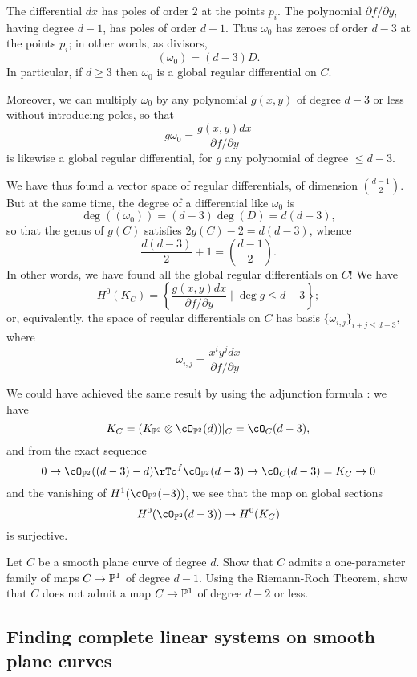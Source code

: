 The differential $dx$ has poles of order $2$ at the points $p_i$. The polynomial $\partial f/\partial y$, having degree $d-1$, has poles of order $d-1$. Thus $\omega_0$ has zeroes of order $d-3$ at the points $p_i$; in other words, as divisors,
$$
(\omega_0) = (d-3)D.
$$
In particular, if $d \geq 3$ then $\omega_0$ is a global regular differential on $C$.

Moreover, we can  multiply $\omega_0$ by any polynomial $g(x,y)$ 
  of degree $d-3$ or less without introducing poles, so that 
$$
g\omega_0 = \frac{g(x,y)dx}{\partial f/\partial y}
$$ 
is likewise a global regular differential, for $g$  any polynomial of degree $\leq d-3$.

We have thus found a vector space of regular differentials, of dimension $\binom{d-1}{2}$. But at the same time, the degree of a differential like $\omega_0$ is
$$
\deg((\omega_0)) = (d-3)\deg(D) = d(d-3),
$$
so that the genus of $g(C)$ satisfies
$2g(C)-2 = d(d-3)$, whence
$$
\frac{d(d-3)}{2} + 1 = \binom{d-1}{2}.
$$
In other words, we have found all the global regular differentials on $C$! We have
$$
H^0(K_C) = \left\{ \frac{g(x,y)dx}{\partial f/\partial y} \mid \deg g \leq d-3\right\};
$$
or, equivalently, the space of regular differentials on $C$ has basis $\{\omega_{i,j} \}_{i+j \leq d-3}$, where
$$
\omega_{i,j} =  \frac{x^iy^jdx}{\partial f/\partial y}
$$

We could have achieved the same result by using the adjunction formula : we have
$$
K_C = (K_{\PP^2} \otimes \cO_{\PP^2}(d))|_C = \cO_C(d-3),
$$
and from the exact sequence
$$
0 \to \cO_{\PP^2}((d-3)-d) \rTo^f \cO_{\PP^2}(d-3) \to \cO_C(d-3)=K_C \to 0
$$
and the vanishing of $H^1(\cO_{\PP^2}(-3))$, we see that the map on global sections
$$
H^0(\cO_{\PP^2}(d-3)) \to H^0(K_C)
$$
is surjective. 

\begin{exercise}\label{gonality of smooth plane curve}
Let $C$ be a smooth plane curve of degree $d$. Show that $C$ admits a one-parameter family of maps $C \to \PP^1$ of degree $d-1$. Using the Riemann-Roch Theorem, show that $C$ does not admit a map $C \to \PP^1$ of degree $d-2$ or less.
\end{exercise}


\subsection{Finding complete linear systems on smooth plane curves}

